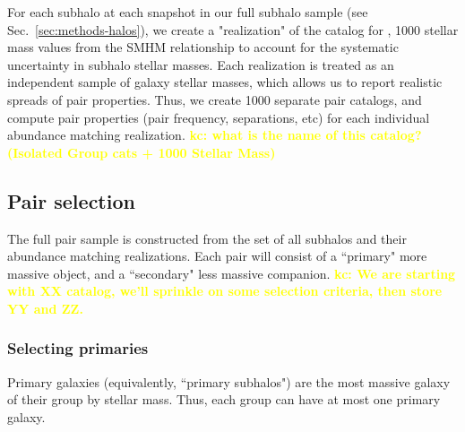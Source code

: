\documentclass[twocolumn]{aastex631}
\newcommand{\kc}[1]{\textcolor{yellow}{\textbf{kc: #1}} }
\begin{document}
    For each subhalo at each snapshot in our full subhalo sample (see Sec.~\ref{sec:methods-halos}), we create a "realization" of the catalog for , 1000 stellar mass values from the SMHM relationship to account for the systematic uncertainty in subhalo stellar masses.
    Each realization is treated as an independent sample of galaxy stellar masses, which allows us to report realistic spreads of pair properties.
    Thus, we create 1000 separate pair catalogs, and compute pair properties (pair frequency, separations, etc) for each individual abundance matching realization.
    \kc{what is the name of this catalog? (Isolated Group cats + 1000 Stellar Mass) }


    \subsection{Pair selection}\label{sec:methods-pairs}
    The full pair sample is constructed from the set of all subhalos and their abundance matching realizations. Each pair will consist of a ``primary" more massive object, and a ``secondary" less massive companion. 
    \kc{We are starting with XX catalog, we'll sprinkle on some selection criteria, then store YY and ZZ. }


    \subsubsection{Selecting primaries}
        Primary galaxies (equivalently, ``primary subhalos") are the most massive galaxy of their group by stellar mass. Thus, each group can have at most one primary galaxy.  
        
\end{document}
